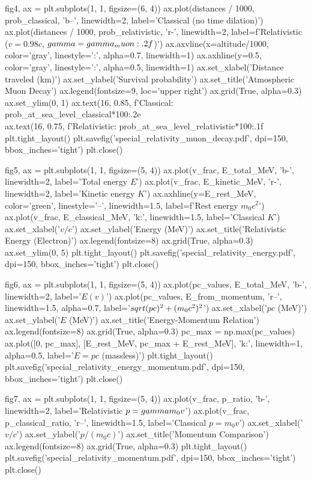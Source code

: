 \documentclass[a4paper, 11pt]{article}
\begin{document}
\begin{pycode}
fig4, ax = plt.subplots(1, 1, figsize=(6, 4))
ax.plot(distances / 1000, prob_classical, 'b--', linewidth=2,
        label='Classical (no time dilation)')
ax.plot(distances / 1000, prob_relativistic, 'r-', linewidth=2,
        label=f'Relativistic ($v=0.98c$, $\\gamma={gamma_muon:.2f}$)')
ax.axvline(x=altitude/1000, color='gray', linestyle=':', alpha=0.7, linewidth=1)
ax.axhline(y=0.5, color='gray', linestyle=':', alpha=0.5, linewidth=1)
ax.set_xlabel('Distance traveled (km)')
ax.set_ylabel('Survival probability')
ax.set_title('Atmospheric Muon Decay')
ax.legend(fontsize=9, loc='upper right')
ax.grid(True, alpha=0.3)
ax.set_ylim(0, 1)
ax.text(16, 0.85, f'Classical: {prob_at_sea_level_classical*100:.2e}\\%
ax.text(16, 0.75, f'Relativistic: {prob_at_sea_level_relativistic*100:.1f}\\%
plt.tight_layout()
plt.savefig('special_relativity_muon_decay.pdf', dpi=150, bbox_inches='tight')
plt.close()

fig5, ax = plt.subplots(1, 1, figsize=(5, 4))
ax.plot(v_frac, E_total_MeV, 'b-', linewidth=2, label='Total energy $E$')
ax.plot(v_frac, E_kinetic_MeV, 'r-', linewidth=2, label='Kinetic energy $K$')
ax.axhline(y=E_rest_MeV, color='green', linestyle='--', linewidth=1.5,
           label=f'Rest energy $m_0c^2$')
ax.plot(v_frac, E_classical_MeV, 'k:', linewidth=1.5, label='Classical $K$')
ax.set_xlabel('$v/c$')
ax.set_ylabel('Energy (MeV)')
ax.set_title('Relativistic Energy (Electron)')
ax.legend(fontsize=8)
ax.grid(True, alpha=0.3)
ax.set_ylim(0, 5)
plt.tight_layout()
plt.savefig('special_relativity_energy.pdf', dpi=150, bbox_inches='tight')
plt.close()

fig6, ax = plt.subplots(1, 1, figsize=(5, 4))
ax.plot(pc_values, E_total_MeV, 'b-', linewidth=2, label='$E(v)$')
ax.plot(pc_values, E_from_momentum, 'r--', linewidth=1.5, alpha=0.7,
        label='$\\sqrt{(pc)^2 + (m_0c^2)^2}$')
ax.set_xlabel('$pc$ (MeV)')
ax.set_ylabel('$E$ (MeV)')
ax.set_title('Energy-Momentum Relation')
ax.legend(fontsize=8)
ax.grid(True, alpha=0.3)
pc_max = np.max(pc_values)
ax.plot([0, pc_max], [E_rest_MeV, pc_max + E_rest_MeV], 'k:',
        linewidth=1, alpha=0.5, label='$E=pc$ (massless)')
plt.tight_layout()
plt.savefig('special_relativity_energy_momentum.pdf', dpi=150, bbox_inches='tight')
plt.close()

fig7, ax = plt.subplots(1, 1, figsize=(5, 4))
ax.plot(v_frac, p_ratio, 'b-', linewidth=2, label='Relativistic $p = \\gamma m_0 v$')
ax.plot(v_frac, p_classical_ratio, 'r--', linewidth=1.5, label='Classical $p = m_0 v$')
ax.set_xlabel('$v/c$')
ax.set_ylabel('$p/(m_0 c)$')
ax.set_title('Momentum Comparison')
ax.legend(fontsize=8)
ax.grid(True, alpha=0.3)
plt.tight_layout()
plt.savefig('special_relativity_momentum.pdf', dpi=150, bbox_inches='tight')
plt.close()
\end{pycode}
\end{document}
